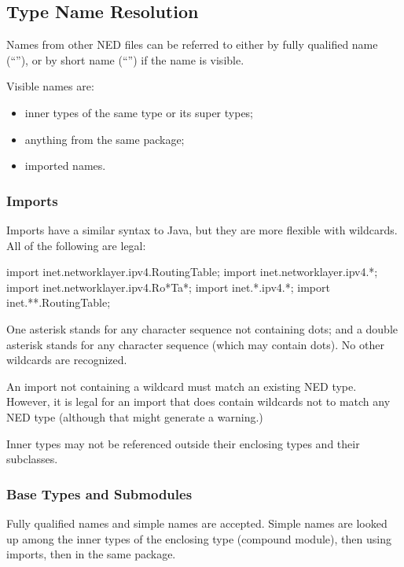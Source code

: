 \subsection{Type Name Resolution}
\label{sec:ned-ref:type-name-resolution}

Names from other NED files can be referred to either by fully qualified
name (``''), or by short name
(``'') if the name is visible.

Visible names are:

\begin{itemize}
  \item inner types of the same type or its super types;
  \item anything from the same package;
  \item imported names.
\end{itemize}

\subsubsection{Imports}
\label{sec:ned-ref:imports}

Imports have a similar syntax to Java, but they are more flexible with wildcards.
All of the following are legal:

\begin{ned}
import inet.networklayer.ipv4.RoutingTable;
import inet.networklayer.ipv4.*;
import inet.networklayer.ipv4.Ro*Ta*;
import inet.*.ipv4.*;
import inet.**.RoutingTable;
\end{ned}

One asterisk stands for any character sequence not containing dots; and a
double asterisk stands for any character sequence (which may contain dots).
No other wildcards are recognized.

An import not containing a wildcard must match an existing NED type.
However, it is legal for an import that does contain wildcards
not to match any NED type (although that might generate a warning.)

Inner types may not be referenced outside their enclosing types and
their subclasses.

\subsubsection{Base Types and Submodules}
\label{sec:ned-ref:base-types-and-submodules}

Fully qualified names and simple names are accepted. Simple names
are looked up among the inner types of the enclosing type (compound
module), then using imports, then in the same package.


